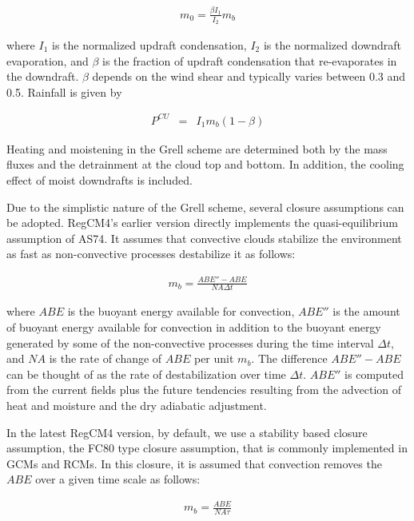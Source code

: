 {\begin{enumerate}
\begin{eqnarray}
m_0=\frac{\beta I_1}{I_2}m_b
\end{eqnarray}

where
$I_1$ is the normalized updraft condensation, $I_2$ is the normalized downdraft
evaporation, and $\beta$ is the fraction of updraft condensation that
re-evaporates in the downdraft. $\beta$ depends on the wind shear and typically
varies between 0.3 and 0.5. Rainfall is given by

\begin{eqnarray}
P^{CU}&=&I_1m_b(1-\beta)
\label{eqn_model:GCCppt}
\end{eqnarray}

Heating and
moistening in the Grell scheme are determined both by the mass fluxes and the
detrainment at the cloud top and bottom. In addition, the cooling effect of
moist downdrafts is included.

Due to the simplistic nature of the Grell scheme, several closure assumptions
can be adopted. RegCM4's earlier version directly implements the
quasi-equilibrium assumption of AS74. It assumes that convective clouds
stabilize the environment as fast as non-convective processes destabilize it as
follows:

\begin{eqnarray}
m_b=\frac{ABE''-ABE}{NA\Delta t}
\label{eqn_model:closureAS}
\end{eqnarray}

where $ABE$ is the buoyant energy
available for convection, $ABE''$ is the amount of buoyant energy available for
convection in addition to the buoyant energy generated by some of the
non-convective processes during the time interval $\Delta t$, and $NA$ is the
rate of change of $ABE$ per unit $m_b$. The difference $ABE''-ABE$ can be
thought of as the rate of destabilization over time $\Delta t$. $ABE''$ is
computed from the current fields plus the future tendencies resulting from the
advection of heat and moisture and the dry adiabatic adjustment.

In the latest RegCM4 version, by default, we use a stability based closure
assumption, the FC80 type closure assumption, that is commonly implemented in
GCMs and RCMs. In this closure, it is assumed that convection removes the $ABE$
over a given time scale as follows:

\begin{eqnarray}
m_b=\frac{ABE}{NA \tau}
\label{eqn_model:closureFC}
\end{eqnarray}


\end{enumerate}}
